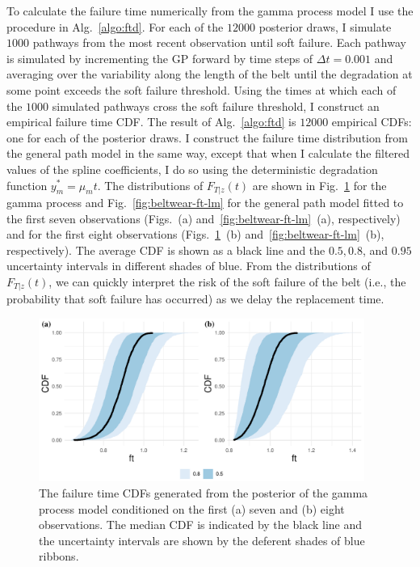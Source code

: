 To calculate the failure time numerically from the gamma process model I use the procedure in Alg.~\ref{algo:ftd}. For each of the $12000$ posterior draws, I simulate $1000$ pathways from the most recent observation until soft failure. Each pathway is simulated by incrementing the GP forward by time steps of $\Delta t = 0.001$ and averaging over the variability along the length of the belt until the degradation at some point exceeds the soft failure threshold. Using the times at which each of the $1000$ simulated pathways cross the soft failure threshold, I construct an empirical failure time CDF. The result of Alg.~\ref{algo:ftd} is $12000$ empirical CDFs: one for each of the posterior draws. I construct the failure time distribution from the general path model in the same way, except that when I calculate the filtered values of the spline coefficients, I do so using the deterministic degradation function $y^*_m = \mu_m t$. The distributions of $F_{T|z}(t)$ are shown in Fig.~\ref{fig:beltwear-ft-gp} for the gamma process and Fig.~\ref{fig:beltwear-ft-lm} for the general path model fitted to the first seven observations (Figs.~(a) and~\ref{fig:beltwear-ft-lm}~(a), respectively) and for the first eight observations (Figs.~\ref{fig:beltwear-ft-gp}~(b) and~\ref{fig:beltwear-ft-lm}~(b), respectively). The average CDF is shown as a black line and the $0.5, 0.8$, and $0.95$ uncertainty intervals in different shades of blue. From the distributions of $F_{T|z}(t)$, we can quickly interpret the risk of the soft failure of the belt (i.e., the probability that soft failure has occurred) as we delay the replacement time.

\begin{figure}[tbp]
  \centering
  \includegraphics[width=0.95\textwidth]{figures/ch-6/belt_wear_failuretime_CDF_gp.pdf}
  \caption{The failure time CDFs generated from the posterior of the gamma process model conditioned on the first (a) seven and (b) eight observations. The median CDF is indicated by the black line and the uncertainty intervals are shown by the deferent shades of blue ribbons.}
  \label{fig:beltwear-ft-gp}
\end{figure}

